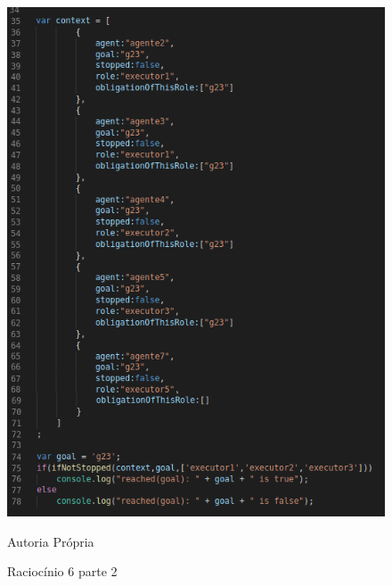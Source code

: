 \begin{figure}[H]
  \centering
  \caption{Raciocínio 6 parte 2}
  \includegraphics[width=0.8\linewidth]{figure/algjs2} 
  \begin{center}
  	Autoria Própria
  \end{center}
  \label{atividiagram2}
\end{figure}